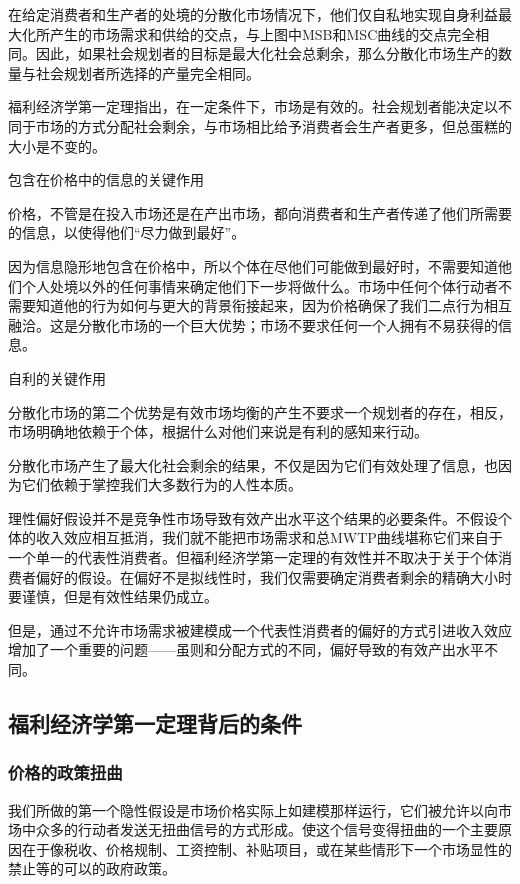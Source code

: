 \documentclass{article}
\begin{document}
在给定消费者和生产者的处境的分散化市场情况下，他们仅自私地实现自身利益最大化所产生的市场需求和供给的交点，与上图中MSB和MSC曲线的交点完全相同。因此，如果社会规划者的目标是最大化社会总剩余，那么分散化市场生产的数量与社会规划者所选择的产量完全相同。

福利经济学第一定理指出，在一定条件下，市场是有效的。社会规划者能决定以不同于市场的方式分配社会剩余，与市场相比给予消费者会生产者更多，但总蛋糕的大小是不变的。

\hspace*{\fill}

包含在价格中的信息的关键作用

价格，不管是在投入市场还是在产出市场，都向消费者和生产者传递了他们所需要的信息，以使得他们“尽力做到最好”。

因为信息隐形地包含在价格中，所以个体在尽他们可能做到最好时，不需要知道他们个人处境以外的任何事情来确定他们下一步将做什么。市场中任何个体行动者不需要知道他的行为如何与更大的背景衔接起来，因为价格确保了我们二点行为相互融洽。这是分散化市场的一个巨大优势；市场不要求任何一个人拥有不易获得的信息。

自利的关键作用

分散化市场的第二个优势是有效市场均衡的产生不要求一个规划者的存在，相反，市场明确地依赖于个体，根据什么对他们来说是有利的感知来行动。

分散化市场产生了最大化社会剩余的结果，不仅是因为它们有效处理了信息，也因为它们依赖于掌控我们大多数行为的人性本质。

理性偏好假设并不是竞争性市场导致有效产出水平这个结果的必要条件。不假设个体的收入效应相互抵消，我们就不能把市场需求和总MWTP曲线堪称它们来自于一个单一的代表性消费者。但福利经济学第一定理的有效性并不取决于关于个体消费者偏好的假设。在偏好不是拟线性时，我们仅需要确定消费者剩余的精确大小时要谨慎，但是有效性结果仍成立。

但是，通过不允许市场需求被建模成一个代表性消费者的偏好的方式引进收入效应增加了一个重要的问题——虽则和分配方式的不同，偏好导致的有效产出水平不同。

\subsection{福利经济学第一定理背后的条件}

\subsubsection{价格的政策扭曲}

我们所做的第一个隐性假设是市场价格实际上如建模那样运行，它们被允许以向市场中众多的行动者发送无扭曲信号的方式形成。使这个信号变得扭曲的一个主要原因在于像税收、价格规制、工资控制、补贴项目，或在某些情形下一个市场显性的禁止等的可以的政府政策。
\end{document}
